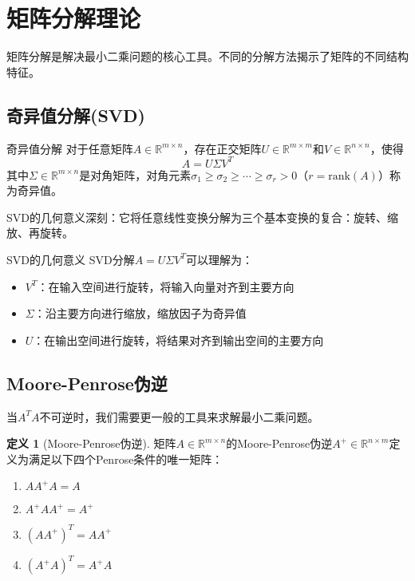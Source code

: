 \documentclass[11pt,a4paper]{ctexart}
\theoremstyle{definition}
\newtheorem{definition}{定义}[section]
\newcommand{\RR}{\mathbb{R}}
\newcommand{\rank}{\text{rank}}
\begin{document}
\section{矩阵分解理论}

矩阵分解是解决最小二乘问题的核心工具。不同的分解方法揭示了矩阵的不同结构特征。

\subsection{奇异值分解(SVD)}

\begin{importantdef}{奇异值分解}
对于任意矩阵$A \in \RR^{m \times n}$，存在正交矩阵$U \in \RR^{m \times m}$和$V \in \RR^{n \times n}$，使得
$$A = U\Sigma V^T$$
其中$\Sigma \in \RR^{m \times n}$是对角矩阵，对角元素$\sigma_1 \geq \sigma_2 \geq \cdots \geq \sigma_r > 0$（$r = \rank(A)$）称为奇异值。
\end{importantdef}

SVD的几何意义深刻：它将任意线性变换分解为三个基本变换的复合：旋转、缩放、再旋转。

\begin{insight}{SVD的几何意义}
SVD分解$A = U\Sigma V^T$可以理解为：
\begin{itemize}
\item $V^T$：在输入空间进行旋转，将输入向量对齐到主要方向
\item $\Sigma$：沿主要方向进行缩放，缩放因子为奇异值
\item $U$：在输出空间进行旋转，将结果对齐到输出空间的主要方向
\end{itemize}
\end{insight}

\subsection{Moore-Penrose伪逆}

当$A^TA$不可逆时，我们需要更一般的工具来求解最小二乘问题。

\begin{definition}[Moore-Penrose伪逆]
矩阵$A \in \RR^{m \times n}$的Moore-Penrose伪逆$A^+ \in \RR^{n \times m}$定义为满足以下四个Penrose条件的唯一矩阵：
\begin{enumerate}
\item $AA^+A = A$
\item $A^+AA^+ = A^+$
\item $(AA^+)^T = AA^+$
\item $(A^+A)^T = A^+A$
\end{enumerate}
\end{definition}
\end{document}
